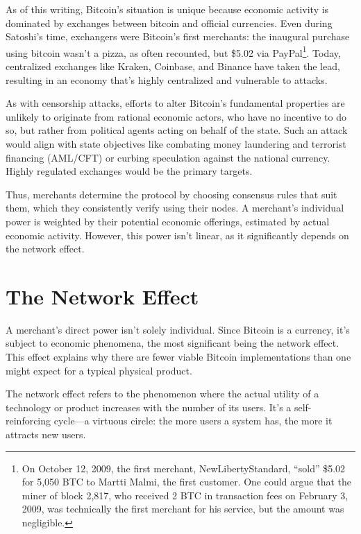 \documentclass[
  a5paper,
  smalldemyvopaper,10pt,twoside,onecolumn,openright,extrafontsizes,hidelinks]{memoir}
\begin{document}
As of this writing, Bitcoin's situation is unique because economic
activity is dominated by exchanges between bitcoin and official
currencies. Even during Satoshi's time, exchangers were Bitcoin's first
merchants: the inaugural purchase using bitcoin wasn't a pizza, as often
recounted, but \$5.02 via PayPal\footnote{On October 12, 2009, the first
  merchant, NewLibertyStandard, ``sold'' \$5.02 for 5,050 BTC to Martti
  Malmi, the first customer. One could argue that the miner of block
  2,817, who received 2 BTC in transaction fees on February 3, 2009, was
  technically the first merchant for his service, but the amount was
  negligible.}. Today, centralized exchanges like Kraken, Coinbase, and
Binance have taken the lead, resulting in an economy that's highly
centralized and vulnerable to attacks.

As with censorship attacks, efforts to alter Bitcoin's fundamental
properties are unlikely to originate from rational economic actors, who
have no incentive to do so, but rather from political agents acting on
behalf of the state. Such an attack would align with state objectives
like combating money laundering and terrorist financing (AML/CFT) or
curbing speculation against the national currency. Highly regulated
exchanges would be the primary targets.

Thus, merchants determine the protocol by choosing consensus rules that
suit them, which they consistently verify using their nodes. A
merchant's individual power is weighted by their potential economic
offerings, estimated by actual economic activity. However, this power
isn't linear, as it significantly depends on the network effect.

\section*{The Network Effect}\label{the-network-effect}


A merchant's direct power isn't solely individual. Since Bitcoin is a
currency, it's subject to economic phenomena, the most significant being
the network effect. This effect explains why there are fewer viable
Bitcoin implementations than one might expect for a typical physical
product.

The network effect refers to the phenomenon where the actual utility of
a technology or product increases with the number of its users. It's a
self-reinforcing cycle---a virtuous circle: the more users a system has,
the more it attracts new users.
\end{document}
